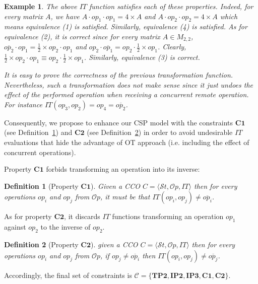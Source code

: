 \documentclass[submission,copyright,creativecommons]{eptcs}
\newtheorem{example}{Example}
\newtheorem{definition}{Definition}
\begin{document}
\begin{example}
The above $IT$ function  satisfies each of these properties. Indeed, for every matrix $A$, we have $A\cdot op_1 \cdot op_1= 4  \times A$ and $A \cdot op_2 \cdot op_2 = 4 \times A$ which means equivalence (1) is satisfied. Similarly, equivalence (4) is satisfied.  
As for equivalence (2), it is correct since for every matrix $A \in M_{2,2}$, $\overline{op_2} \cdot op_1 = \frac{1}{2} \times op_2 \cdot op_1$ and $  op_2 \cdot \overline{op_1} =  op_2 \cdot \frac{1}{2} \times op_1$. Clearly, $\frac{1}{2} \times op_2 \cdot op_1 \equiv op_2 \cdot \frac{1}{2} \times op_1$.
Similarly,  equivalence (3) is correct. 

It is easy to prove the correctness of the previous transformation function. Nevertheless, such  a transformation does not make sense since it just undoes the effect of the performed operation when receiving a concurrent remote operation. For instance $IT(op_3, op_2)=op_4=\overline{op_2}$.  
\end{example}   




Consequently, we propose to enhance our CSP model with 
the  constraints $\mathbf{C1}$ (see Definition~\ref{def:C1}) and $\mathbf{C2}$ (see Definition~\ref{def:C2}) in order to avoid undesirable $IT$ evaluations that  hide the advantage of OT approach (i.e. including the effect of concurrent operations).

Property $\mathbf{C1}$  forbids transforming an operation into its inverse:
\begin{definition}[Property $\mathbf{C1}$]\label{def:C1}
Given a CCO $C=\langle\mathcal{S}t,\mathcal{O}p,IT\rangle$ then for every operations $op_i$ and $op_j$ from $\mathcal{O}p$, it must be that $IT(op_i,op_j)\neq \overline{op_i}$.
\end{definition}

 As for property $\mathbf{C2}$, it discards $IT$ functions transforming an operation $op_1$ against $op_2$ to the inverse of $op_2$. 

\begin{definition}[Property $\mathbf{C2}$]\label{def:C2}
given a CCO $C=\langle\mathcal{S}t,\mathcal{O}p,IT\rangle$ then for every operations $op_i$ and $op_j$ from $\mathcal{O}p$, if $op_j\neq\overline{op_i}$ then $IT(op_i,op_j)\neq \overline{op_j}$.
\end{definition}


Accordingly, the final set of constraints is   $\mathcal{C}=\{\mathbf{TP2}, \mathbf{IP2}, \mathbf{IP3}, \mathbf{C1}, \mathbf{C2}\}$. 
\end{document}
